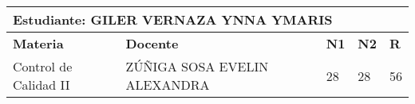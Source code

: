\small
\begin{tabularx}{\textwidth}{|p{5cm}|p{7cm}|X|X|X|}
\hline
\multicolumn{5}{|p{\dimexpr\textwidth-2\tabcolsep-2\arrayrulewidth}|}{\textbf{Estudiante: GILER VERNAZA YNNA YMARIS }}\\\hline
\textbf{Materia} & \textbf{Docente} & \textbf{N1} & \textbf{N2} & \textbf{R} \\ \hline
Control de Calidad II & ZÚÑIGA SOSA EVELIN ALEXANDRA  & 28 & 28& 56 \\ \hline
\end{tabularx}\vspace{10mm}
